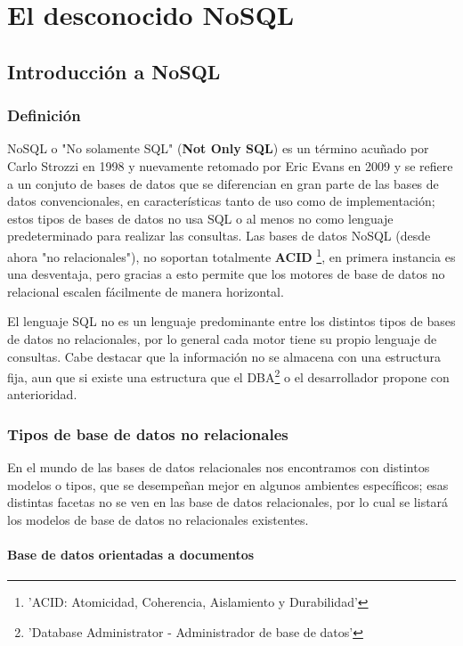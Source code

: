 \part{El desconocido NoSQL} 
\chapter{Introducci\'on a NoSQL}

\section{Definici\'on}

NoSQL o "No solamente SQL" ({\bf Not Only SQL}) es un t\'ermino acu\~nado por Carlo Strozzi en 1998 y nuevamente retomado por Eric Evans en 2009 y se refiere a un conjuto de bases de datos que se diferencian en gran parte de las bases de datos convencionales, en caracter\'isticas tanto de uso como de implementaci\'on; estos tipos de bases de datos no usa SQL o al menos no como lenguaje predeterminado para realizar las consultas. Las bases de datos NoSQL (desde ahora "no relacionales"), no soportan totalmente {\bf ACID} \footnote{'ACID: Atomicidad, Coherencia, Aislamiento y Durabilidad'}, en primera instancia es una desventaja, pero gracias a esto permite que los motores de base de datos no relacional escalen f\'acilmente de manera horizontal. 

El lenguaje SQL no es un lenguaje predominante entre los distintos tipos de bases de datos no relacionales, por lo general cada motor tiene su propio lenguaje de consultas. Cabe destacar que la informaci\'on no se almacena con una estructura fija, aun que si existe una estructura que el DBA\footnote{'Database Administrator - Administrador de base de datos'} o el desarrollador propone con anterioridad.

\section{Tipos de base de datos no relacionales}

En el mundo de las bases de datos relacionales nos encontramos con distintos modelos o tipos, que se desempe\~nan mejor en algunos ambientes espec\'ificos; esas distintas facetas no se ven en las base de datos relacionales, por lo cual se listar\'a los modelos de base de datos no relacionales existentes.

\subsection{Base de datos orientadas a documentos}

